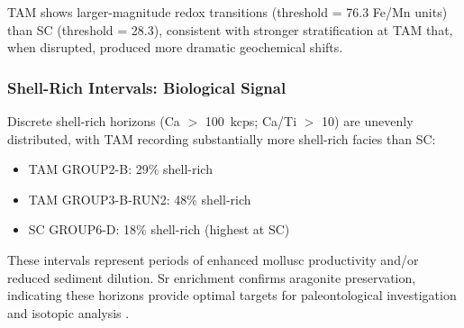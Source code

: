 \documentclass[11pt,a4paper]{article}
\begin{document}
TAM shows larger-magnitude redox transitions (threshold = 76.3 Fe/Mn units) than SC (threshold = 28.3), consistent with stronger stratification at TAM that, when disrupted, produced more dramatic geochemical shifts.

\subsubsection{Shell-Rich Intervals: Biological Signal}

Discrete shell-rich horizons (Ca $>$ 100~kcps; Ca/Ti $>$ 10) are unevenly distributed, with TAM recording substantially more shell-rich facies than SC:

\begin{itemize}
    \item TAM GROUP2-B: 29\% shell-rich
    \item TAM GROUP3-B-RUN2: 48\% shell-rich
    \item SC GROUP6-D: 18\% shell-rich (highest at SC)
\end{itemize}

These intervals represent periods of enhanced mollusc productivity and/or reduced sediment dilution. Sr enrichment confirms aragonite preservation, indicating these horizons provide optimal targets for paleontological investigation and isotopic analysis \citep{Vonhof2003, Kaandorp2005}.







%
\end{document}
